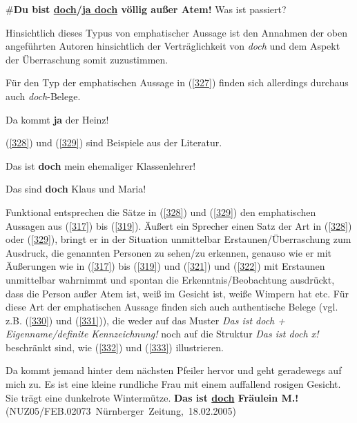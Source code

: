 \begin{exe}
	\ex\label{326}
	\glqq \#\textbf{Du bist \underline{doch}/\underline{ja doch} völlig außer Atem!} Was ist passiert?\grqq{}
\end{exe}
Hinsichtlich dieses Typus von emphatischer Aussage  ist den Annahmen der oben angeführten Autoren hinsichtlich der Verträglichkeit von \textit{doch} und dem Aspekt der Überraschung somit zuzustimmen. 

Für den Typ der emphatischen Aussage in (\ref{327}) finden sich allerdings durchaus auch \textit{doch}-Belege.
	
\begin{exe}
	\ex\label{327} 
	Da kommt \textbf{ja} der Heinz!
	\hfill\hbox {\citet[215]{Thurmair1989}}
\end{exe}		            		
(\ref{328}) und (\ref{329}) sind Beispiele aus der Literatur.

\begin{exe}
	\ex\label{328} 
	Das ist \textbf{doch} mein ehemaliger Klassenlehrer!	
	\hfill\hbox {\citet[196]{Rinas2006}}
\end{exe}
\vspace{-0.65cm}
\begin{exe}
	\ex\label{329} 
	Das sind \textbf{doch} Klaus und Maria!	
	\hfill\hbox {\citet[86]{Dahl1988}}
\end{exe}											         
Funktional entsprechen die Sätze in (\ref{328}) und (\ref{329}) den emphatischen Aussagen aus (\ref{317}) bis (\ref{319}). Äußert ein Sprecher einen Satz der Art in (\ref{328}) oder (\ref{329}), bringt er in der Situation unmittelbar Erstaunen/Überraschung zum Ausdruck, die ge\-nannten Personen zu sehen/zu erkennen, genauso wie er mit Äußerungen wie in (\ref{317}) bis (\ref{319}) und (\ref{321}) und (\ref{322}) mit Erstaunen unmittelbar wahrnimmt und spontan die Erkenntnis/Beobachtung ausdrückt, dass die Person außer Atem ist, weiß im Gesicht ist, weiße Wimpern hat etc. Für diese Art der emphatischen Aussage finden sich auch authentische Belege (vgl. z.B. (\ref{330}) und (\ref{331})), die weder auf das Muster \textit{Das ist doch + Eigenname/definite Kennzeichnung!} noch auf die Struktur \textit{Das ist doch x!} beschränkt sind, wie (\ref{332}) und (\ref{333}) illustrieren.
	
\begin{exe}
	\ex\label{330}
	\scriptsize 
	Da kommt jemand hinter dem nächsten Pfeiler hervor und geht geradewegs auf mich zu. Es ist eine kleine rundliche Frau mit einem auffallend rosigen 			Gesicht. Sie trägt eine dunkelrote Wintermütze. \textbf{Das ist \underline{doch} Fräulein M.!}     
	\hfill\hbox{(NUZ05/FEB.02073 Nürnberger Zeitung, 18.02.2005)}	
\end{exe}	
	
